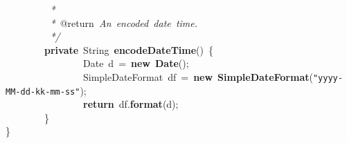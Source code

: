 \mbox{}\textit{\ \ \ \ \ \ \ \ \ *} \\
\mbox{}\textit{\ \ \ \ \ \ \ \ \ *\ }@return\textit{\ An\ encoded\ date\ time.} \\
\mbox{}\textit{\ \ \ \ \ \ \ \ \ */} \\
\mbox{}\ \ \ \ \ \ \ \ \textbf{private}\ String\ \textbf{encodeDateTime}()\ \{ \\
\mbox{}\ \ \ \ \ \ \ \ \ \ \ \ \ \ \ \ Date\ d\ =\ \textbf{new}\ \textbf{Date}(); \\
\mbox{}\ \ \ \ \ \ \ \ \ \ \ \ \ \ \ \ SimpleDateFormat\ df\ =\ \textbf{new}\ \textbf{SimpleDateFormat}(\texttt{"{}yyyy-MM-dd-kk-mm-ss"{}}); \\
\mbox{}\ \ \ \ \ \ \ \ \ \ \ \ \ \ \ \ \textbf{return}\ df.\textbf{format}(d); \\
\mbox{}\ \ \ \ \ \ \ \ \} \\
\mbox{}\} \\

\clearpage
\normalsize
\rmfamily
